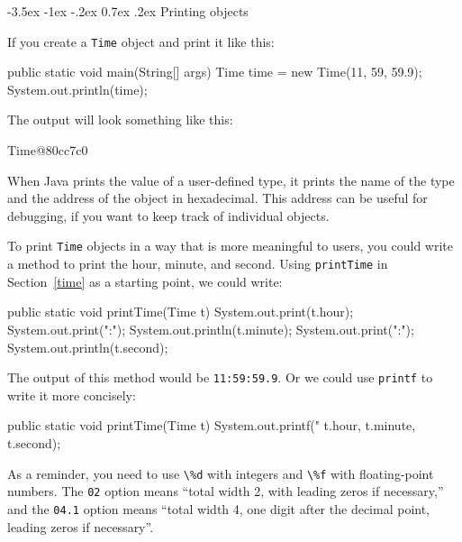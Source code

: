\documentclass[12pt]{book}
\makeatletter
\theoremstyle{exercise}
\newcommand{\java}[1]{\verb"#1"}
\renewcommand{\section}{\@startsection{section}{1}{\z@}%
    {-3.5ex \@plus -1ex \@minus -.2ex}%
    {0.7ex \@plus.2ex}%
    {\normalfont\Large\bfseries}}
\newcommand{\java}[1]{\lstinline{#1}} %
\makeatother
\begin{document}
\section{Printing objects}
\label{printobject}

If you create a \java{Time} object and print it like this:

\begin{code}
    public static void main(String[] args) {
        Time time = new Time(11, 59, 59.9);
        System.out.println(time);
    }
\end{code}


The output will look something like this:

\begin{stdout}
Time@80cc7c0
\end{stdout}

When Java prints the value of a user-defined type, it prints the name of the type and the address of the object in hexadecimal.
This address can be useful for debugging, if you want to keep track of individual objects.


To print \java{Time} objects in a way that is more meaningful to users, you could write a method to print the hour, minute, and second.
Using \java{printTime} in Section~\ref{time} as a starting point, we could write:

\begin{code}
    public static void printTime(Time t) {
        System.out.print(t.hour);
        System.out.print(":");
        System.out.println(t.minute);
        System.out.print(":");
        System.out.println(t.second);
    }
\end{code}

The output of this method would be {\tt 11:59:59.9}.
Or we could use \java{printf} to write it more concisely:


\begin{code}
    public static void printTime(Time t) {
        System.out.printf("%
            t.hour, t.minute, t.second);
    }
\end{code}

As a reminder, you need to use \java{\%d} with integers and \java{\%f} with floating-point numbers.
The \java{02} option means ``total width 2, with leading zeros if necessary,'' and the \java{04.1} option means ``total width 4, one digit after the decimal point, leading zeros if necessary''.
\end{document}
